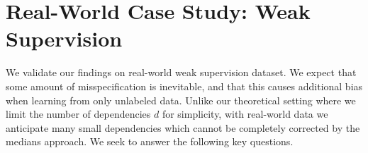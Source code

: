 \section{Real-World Case Study: Weak Supervision} \label{sec:exp}
\vspace{-.5em}






We validate our findings on real-world weak supervision dataset. We expect that some amount of misspecification is inevitable, and that this causes additional bias when learning from only unlabeled data. Unlike our theoretical setting where we limit the number of dependencies $d$ for simplicity, with real-world data we anticipate many small dependencies which cannot be completely corrected by the medians approach. We seek to answer the following key questions.

